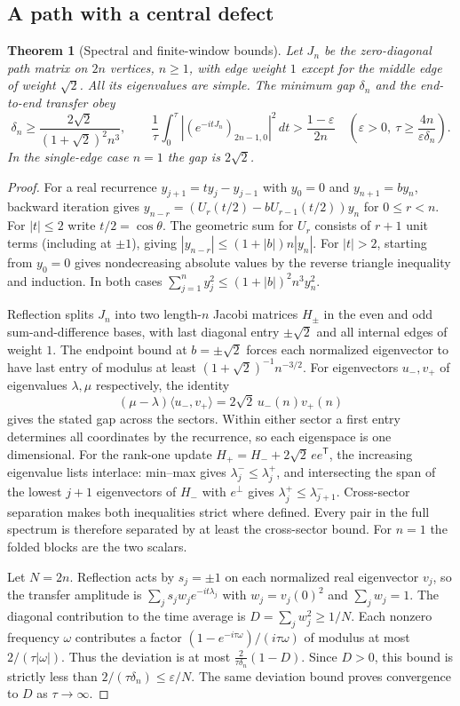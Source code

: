 \documentclass[11pt,reqno]{amsart}
\newtheorem{theorem}{Theorem}[section]
\theoremstyle{definition}
\theoremstyle{remark}
\numberwithin{equation}{section}
\newcommand{\ip}[2]{\langle #1,#2\rangle}
\begin{document}
\subsection{A path with a central defect}

\begin{theorem}[Spectral and finite-window bounds]\label{m4:defect}
Let $J_n$ be the zero-diagonal path matrix on $2n$ vertices, $n\ge1$, with edge weight $1$ except for the middle edge of weight $\sqrt2$. All its eigenvalues are simple. The minimum gap $\delta_n$ and the end-to-end transfer obey
\[
 \delta_n\ge \frac{2\sqrt2}{(1+\sqrt2)^2n^3},\qquad
 \frac1{\tau}\int_0^\tau |(e^{-itJ_n})_{2n-1,0}|^2\,dt
 >\frac{1-\varepsilon}{2n}
 \quad\left(\varepsilon>0,\ \tau\ge\frac{4n}{\varepsilon\delta_n}\right).
\]
In the single-edge case $n=1$ the gap is $2\sqrt2$.
\end{theorem}
\begin{proof}
For a real recurrence $y_{j+1}=t y_j-y_{j-1}$ with $y_0=0$ and $y_{n+1}=b y_n$, backward iteration gives $y_{n-r}=(U_r(t/2)-b U_{r-1}(t/2))y_n$ for $0\le r<n$. For $|t|\le2$ write $t/2=\cos\theta$. The geometric sum for $U_r$ consists of $r+1$ unit terms (including at $\pm1$), giving $|y_{n-r}|\le(1+|b|)n|y_n|$. For $|t|>2$, starting from $y_0=0$ gives nondecreasing absolute values by the reverse triangle inequality and induction. In both cases $\sum_{j=1}^n y_j^2\le(1+|b|)^2 n^3 y_n^2$.

Reflection splits $J_n$ into two length-$n$ Jacobi matrices $H_\pm$ in the even and odd sum-and-difference bases, with last diagonal entry $\pm\sqrt2$ and all internal edges of weight $1$. The endpoint bound at $b=\pm\sqrt2$ forces each normalized eigenvector to have last entry of modulus at least $(1+\sqrt2)^{-1}n^{-3/2}$. For eigenvectors $u_-,v_+$ of eigenvalues $\lambda,\mu$ respectively, the identity
\[
 (\mu-\lambda)\ip{u_-}{v_+}=2\sqrt2\,u_-(n)v_+(n)
\]
gives the stated gap across the sectors. Within either sector a first entry determines all coordinates by the recurrence, so each eigenspace is one dimensional. For the rank-one update $H_+=H_-+2\sqrt2\,ee^{\mathsf T}$, the increasing eigenvalue lists interlace: min--max gives $\lambda_j^-\le\lambda_j^+$, and intersecting the span of the lowest $j+1$ eigenvectors of $H_-$ with $e^\perp$ gives $\lambda_j^+\le\lambda_{j+1}^-$. Cross-sector separation makes both inequalities strict where defined. Every pair in the full spectrum is therefore separated by at least the cross-sector bound. For $n=1$ the folded blocks are the two scalars.

Let $N=2n$. Reflection acts by $s_j=\pm1$ on each normalized real eigenvector $v_j$, so the transfer amplitude is $\sum_j s_jw_j e^{-it\lambda_j}$ with $w_j=v_j(0)^2$ and $\sum_j w_j=1$. The diagonal contribution to the time average is $D=\sum_j w_j^2\ge1/N$. Each nonzero frequency $\omega$ contributes a factor $(1-e^{-i\tau\omega})/(i\tau\omega)$ of modulus at most $2/(\tau|\omega|)$. Thus the deviation is at most $\frac{2}{\tau\delta_n}(1-D)$. Since $D>0$, this bound is strictly less than $2/(\tau\delta_n)\le\varepsilon/N$. The same deviation bound proves convergence to $D$ as $\tau\to\infty$.
\end{proof}
\end{document}
